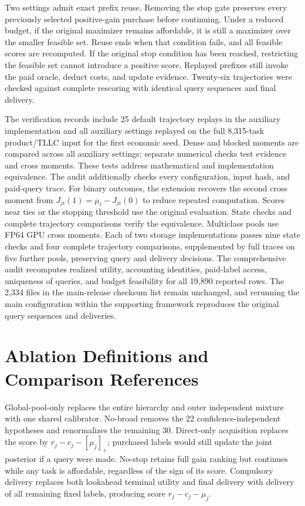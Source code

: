 \documentclass[journal]{IEEEtran}
\begin{document}
Two settings admit exact prefix reuse. Removing the stop gate preserves every previously selected positive-gain purchase before continuing. Under a reduced budget, if the original maximizer remains affordable, it is still a maximizer over the smaller feasible set. Reuse ends when that condition fails, and all feasible scores are recomputed. If the original stop condition has been reached, restricting the feasible set cannot introduce a positive score. Replayed prefixes still invoke the paid oracle, deduct costs, and update evidence. Twenty-six trajectories were checked against complete rescoring with identical query sequences and final delivery.

The verification records include 25 default trajectory replays in the auxiliary implementation and all auxiliary settings replayed on the full 8,315-task product/TLLC input for the first economic seed. Dense and blocked moments are compared across all auxiliary settings; separate numerical checks test evidence and cross moments. These tests address mathematical and implementation equivalence. The audit additionally checks every configuration, input hash, and paid-query trace. For binary outcomes, the extension recovers the second cross moment from $J_{ji}(1)=\mu_i-J_{ji}(0)$ to reduce repeated computation. Scores near ties or the stopping threshold use the original evaluation. State checks and complete trajectory comparisons verify the equivalence. Multiclass pools use FP64 GPU cross moments. Each of two storage implementations passes nine state checks and four complete trajectory comparisons, supplemented by full traces on five further pools, preserving query and delivery decisions. The comprehensive audit recomputes realized utility, accounting identities, paid-label access, uniqueness of queries, and budget feasibility for all 19,890 reported rows. The 2,334 files in the main-release checksum list remain unchanged, and rerunning the main configuration within the supporting framework reproduces the original query sequences and deliveries.

\section{Ablation Definitions and Comparison References}
\label{app:ablations}
Global-pool-only replaces the entire hierarchy and outer independent mixture with one shared calibrator. No-broad removes the 22 confidence-independent hypotheses and renormalizes the remaining 30. Direct-only acquisition replaces the score by $r_j-c_j-[\mu_j]_+$; purchased labels would still update the joint posterior if a query were made. No-stop retains full gain ranking but continues while any task is affordable, regardless of the sign of its score. Compulsory delivery replaces both lookahead terminal utility and final delivery with delivery of all remaining fixed labels, producing score $r_j-c_j-\mu_j$.
\end{document}
